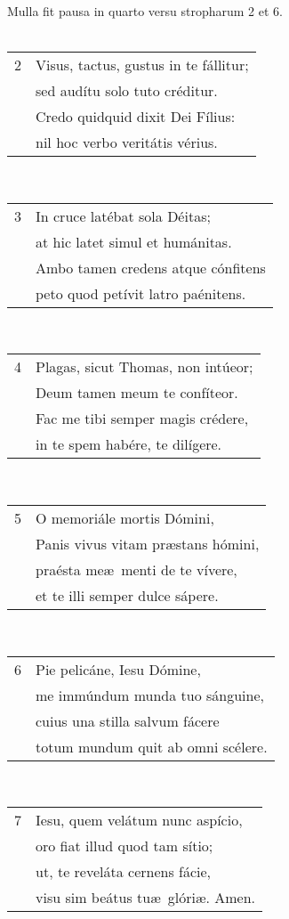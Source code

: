 \documentclass[12pt, a5paper]{book}
\begin{document}
\pagebreak
{}
Mulla fit pausa in quarto versu stropharum 2 et 6.\\\\
\begin{tabular}{ll}
2 &Visus, tactus, gustus in te fállitur;\\
&sed audítu solo tuto créditur.\\
&Credo quidquid dixit Dei Fílius:\\
&nil hoc verbo veritátis vérius.\\
\end{tabular}
\\
\begin{tabular}{ll}
3 &In cruce latébat sola Déitas;\\
&at hic latet simul et humánitas.\\
&Ambo tamen credens atque cónfitens\\
&peto quod petívit latro paénitens.\\
\end{tabular}
\\
\begin{tabular}{ll}
4 &Plagas, sicut Thomas, non intúeor;\\
&Deum tamen meum te confíteor.\\
&Fac me tibi semper magis crédere,\\
&in te spem habére, te dilígere.\\
\end{tabular}
\\
\begin{tabular}{ll}
5 &O memoriále mortis Dómini,\\
&Panis vivus vitam pr\ae stans hómini,\\
&praésta me\ae \ menti de te vívere,\\
&et te illi semper dulce sápere.\\
\end{tabular}
\\
\begin{tabular}{ll}
6 &Pie pelicáne, Iesu Dómine,\\
&me immúndum munda tuo sánguine,\\
&cuius una stilla salvum fácere\\
&totum mundum quit ab omni scélere.\\
\end{tabular}
\\
\begin{tabular}{ll}
7 &Iesu, quem velátum nunc aspício,\\
&oro fiat illud quod tam sítio;\\
&ut, te reveláta cernens fácie,\\
&visu sim beátus tu\ae \ glóri\ae . Amen.
\end{tabular}
\end{document}
